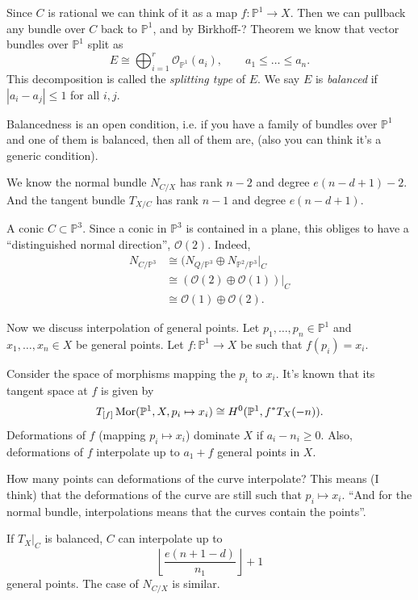 Since $C$ is rational we can think of it
as a map $f:\mathbb{P}^1 \to X$.
Then we can pullback any bundle over $C$
back to $\mathbb{P}^1$,
and by Birkhoff-? Theorem
we know that vector bundles over
$\mathbb{P}^1$
split as
$$
E\cong \bigoplus_{i=1}^r
\mathcal{O}_{\mathbb{P}^1}(a_i),
\qquad a_1\leq \ldots \leq a_n.
$$
This decomposition is called the
{\it splitting type} of $E$.
We say $E$ is {\it balanced} if
$|a_i-a_j|\leq 1$ for all $i,j$.

Balancedness is an open condition,
i.e. if you have a family of bundles over
$\mathbb{P}^1$
and one of them is balanced, then all of them
are,
(also you can think it's a generic
condition).

We know the normal bundle $N_{C/X}$ has rank
$n-2$
and degree  $e(n-d+1)-2$.
And the tangent bundle $T_{X/C}$
has rank $n-1$ and degree $e(n-d+1)$.

\begin{example}
\label{example-conic}
A conic $C \subset \mathbb{P}^3$.
Since a conic in $\mathbb{P}^3$ is contained
in a plane,
this obliges to have a ``distinguished normal
direction'',
$\mathcal{O}(2)$. Indeed,
$$
\begin{aligned}
N_{C/\mathbb{P}^3}&\cong(N_{Q/\mathbb{P}^3}
\oplus
N_{\mathbb{P}^2/\mathbb{P}^3}|_{C}\\
&\cong(\mathcal{O}(2) \oplus
\mathcal{O}(1))|_{C}\\
&\cong\mathcal{O}(1)\oplus \mathcal{O}(2).
\end{aligned}
$$
\end{example}

\medskip\noindent
Now we discuss interpolation of general
points.
Let $p_1,\ldots,p_n \in \mathbb{P}^1$
and $x_1,\ldots, x_n \in X$
be general points.
Let $f:\mathbb{P}^1 \to X$ be such that
$f(p_i)=x_i$.

Consider the space of morphisms mapping
the  $p_i$ to $x_i$. It's known that its
tangent space
at $f$
is given by
$$
T_{[f]}\mathop{\mathrm{Mor}}\nolimits(\mathbb{P}^1,X,p_i \mapsto x_i)
\cong H^0(\mathbb{P}^1,f^*T_X(-n)).
$$
\noindent
Deformations of $f$ (mapping $p_i \mapsto
x_i$)
dominate $X$ if $a_i-n_i \geq 0$.
Also, deformations of $f$ interpolate up
to $a_1+f$ general points in $X$.

\medskip\noindent
How many points can deformations of the curve
interpolate?
This means (I think) that the deformations of
the curve
are still such that $p_i \mapsto  x_i$.
``And for the normal bundle, interpolations
means that the curves contain the points''.

If $T_X|_{C}$ is balanced, $C$ can
interpolate up to
$$
\left\lfloor \frac{e(n+1-d)}{n_1}
\right\rfloor +1
$$
general points. The case of $N_{C/X}$ is
similar.

